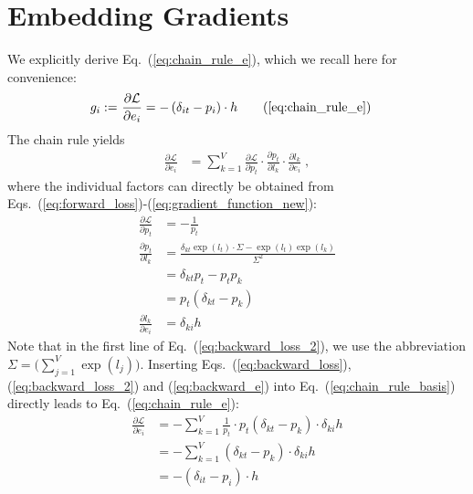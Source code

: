 \pagebreak
\section{Embedding Gradients}
\label{app:chain_rule_e}

We explicitly derive Eq.~(\ref{eq:chain_rule_e}), which we recall here for convenience:
\begin{align}
g_i :=~ &\frac{\partial \mathcal{L}}{\partial e_i} 
= - \left( \delta_{it} - p_i \right) \cdot h \tag{\ref{eq:chain_rule_e}}
\end{align}
The chain rule yields
\begin{align}
\frac{\partial \mathcal{L}}{\partial e_i} 
&= \sum_{k=1}^{V} \frac{\partial \mathcal{L}}{\partial p_t} 
\cdot \frac{\partial p_t}{\partial l_k}  
\cdot \frac{\partial l_k}{\partial e_i} \; ,
\label{eq:chain_rule_basis}
\end{align}
where the individual factors can directly be obtained from Eqs.~(\ref{eq:forward_loss})-(\ref{eq:gradient_function_new}):
\begin{align}
\frac{\partial \mathcal{L}}{\partial p_t} &= - \frac{1}{p_t} \label{eq:backward_loss} \\
\frac{\partial p_t}{\partial l_k} 
&= \frac{\delta_{kt} \exp{(l_t)} \cdot \Sigma - \exp{(l_t)} \exp{(l_k)}}{\Sigma^2} \nonumber \\ 
&= \delta_{kt} p_t - p_t p_k \nonumber \\
&= p_t ( \delta_{kt} - p_k ) 
\label{eq:backward_loss_2} \\
\frac{\partial l_k}{\partial e_i} &= \delta_{ki} h \label{eq:backward_e}
\end{align}
Note that in the first line of Eq.~(\ref{eq:backward_loss_2}), we use the abbreviation $\Sigma = \Big( \sum_{j=1}^V \exp{(l_j)} \Big)$.
Inserting Eqs.~(\ref{eq:backward_loss}), (\ref{eq:backward_loss_2}) and (\ref{eq:backward_e}) into Eq.~(\ref{eq:chain_rule_basis}) directly leads to Eq.~(\ref{eq:chain_rule_e}):
\begin{align}
\frac{\partial \mathcal{L}}{\partial e_i} 
&= - \sum_{k=1}^{V} \frac{1}{p_t}
\cdot p_t ( \delta_{kt} - p_k )  
\cdot \delta_{ki} h \nonumber \\
&= - \sum_{k=1}^{V} ( \delta_{kt} - p_k )  
\cdot \delta_{ki} h \nonumber \\
&= - ( \delta_{it} - p_i )  
\cdot h \nonumber
\end{align}
